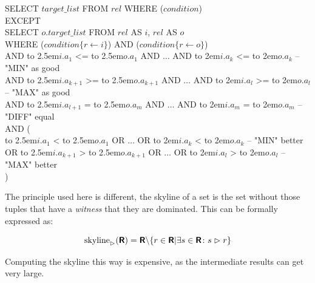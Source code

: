 \begin{sql}\label{sql:rewrite-with-except}
\newcommand\abox[1]{\hbox to 2.5em{#1\hfil}}%
\newcommand\bbox[1]{\hbox to 2em{#1\hfil}}%
SELECT $target\_list$ FROM $rel$ WHERE ($condition$) \\
EXCEPT \\
SELECT $o.target\_list$ FROM $rel$ AS $i$, $rel$ AS $o$\\
WHERE ($condition\{r \gets i\}$) AND ($condition\{r \gets o\}$)\\
AND \abox{$i.a_1$} <= \abox{$o.a_1$} AND $\ldots$ AND \bbox{$i.a_k$} <= \bbox{$o.a_k$} -- "MIN" as good\\
AND \abox{$i.a_{k+1}$} >= \abox{$o.a_{k+1}$} AND $\ldots$ AND \bbox{$i.a_l$} >= \bbox{$o.a_l$} -- "MAX" as good\\
AND \abox{$i.a_{l+1}$} { }= \abox{$o.a_m$} AND $\ldots$ AND \bbox{$i.a_m$} { }= \bbox{$o.a_m$} -- "DIFF" equal \\
AND (\\
\phantom{{ }{ }{ }}\abox{$i.a_1$} < \abox{$o.a_1$} OR $\ldots$ OR \bbox{$i.a_k$} < \bbox{$o.a_k$} -- "MIN" better \\
OR \abox{$i.a_{k+1}$} > \abox{$o.a_{k+1}$} OR $\ldots$ OR \bbox{$i.a_l$} > \bbox{$o.a_l$} -- "MAX" better \\
)
\end{sql}

\noindent
The principle used here is different, the skyline of a set is the set
without those tuples that have a \emph{witness} that
they are dominated. This can be formally expressed as:

\begin{equation}
\skyline_\dominates(\relation{R}) = \relation{R} \backslash \{r \in \relation{R}|\exists s \in \relation{R}\colon s \dominates r\}
\end{equation}

Computing the skyline this way is expensive, as the intermediate
results can get very large.

